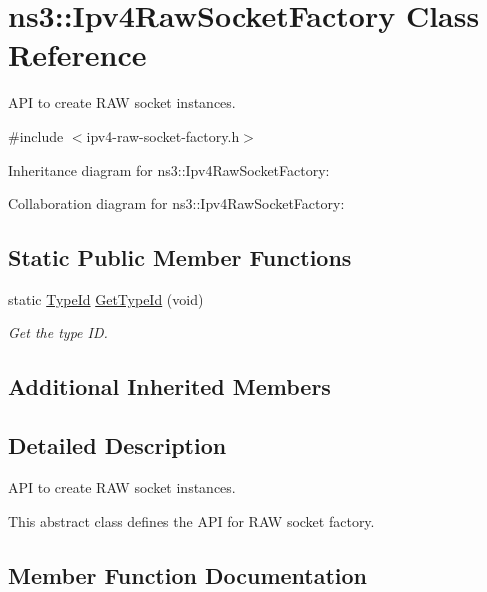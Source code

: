 \hypertarget{classns3_1_1Ipv4RawSocketFactory}{}\section{ns3\+:\+:Ipv4\+Raw\+Socket\+Factory Class Reference}
\label{classns3_1_1Ipv4RawSocketFactory}


A\+PI to create R\+AW socket instances.  




{\ttfamily \#include $<$ipv4-\/raw-\/socket-\/factory.\+h$>$}



Inheritance diagram for ns3\+:\+:Ipv4\+Raw\+Socket\+Factory\+:


Collaboration diagram for ns3\+:\+:Ipv4\+Raw\+Socket\+Factory\+:
\subsection*{Static Public Member Functions}
\begin{DoxyCompactItemize}
\item 
static \hyperlink{classns3_1_1TypeId}{Type\+Id} \hyperlink{classns3_1_1Ipv4RawSocketFactory_abc5812e2f1d50dbd4c94ec39b9e0d93c}{Get\+Type\+Id} (void)
\begin{DoxyCompactList}\small\item\em Get the type ID. \end{DoxyCompactList}\end{DoxyCompactItemize}
\subsection*{Additional Inherited Members}


\subsection{Detailed Description}
A\+PI to create R\+AW socket instances. 

This abstract class defines the A\+PI for R\+AW socket factory. 

\subsection{Member Function Documentation}
